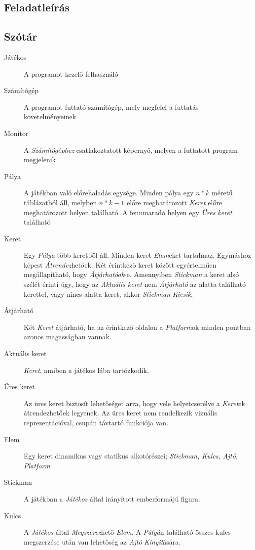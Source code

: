 \subsection{Feladatleírás}
\subsection{Szótár}

\begin{description}

    \item[Játékos] A programot kezelő felhasználó
    \item[Számítógép] A programot futtató számítógép, mely megfelel a futtatás követelményeinek
    \item[Monitor] A \emph{Számítógéphez} csatlakoztatott képernyő, melyen a futtatott program megjelenik
    \item[Pálya] A játékban való előrehaladás egysége. Minden pálya egy $n*k$ méretű táblázatból áll, melyben $n*k-1$ előre meghatározott \emph{Keret} előre meghatározott helyen található. A fennmaradó helyen egy \emph{Üres keret} található
    \item[Keret] Egy \emph{Pálya} több keretből áll. Minden keret \emph{Elem}eket tartalmaz. Egymáshoz képest \emph{Átrendez}hetőek. Két érintkező keret között egyértelműen megállapítható, hogy \emph{Átjárhatóak}-e. Amennyiben \emph{Stickman} a keret alsó szélét érinti úgy, hogy az \emph{Aktuális keret} nem \emph{Átjárható} az alatta található kerettel, vagy nincs alatta keret, akkor \emph{Stickman} \emph{Kiesik}.
    \item[Átjárható] Két \emph{Keret} átjárható, ha az érintkező oldalon a \emph{Platform}ok minden pontban azonos magasságban vannak.
    \item[Aktuális keret] \emph{Keret}, amiben a játékos lába tartózkodik.
    \item[Üres keret] Az üres keret biztosít lehetőséget arra, hogy vele helyetcserélve a \emph{Keret}ek átrendezhetőek legyenek. Az üres keret nem rendelkezik vizuális reprezentációval, csupán távtartó funkciója van.
    \item[Elem] Egy keret dinamikus vagy statikus alkotórészei; \emph{Stickman, Kulcs, Ajtó, Platform}
    \item[Stickman] A játékban a \emph{Játékos} által irányított emberformájú figura.
    \item[Kulcs] A \emph{Játékos} által \emph{Megszerez}hető \emph{Elem}. A \emph{Pályá}n található összes kulcs megszerzése után van lehetőség az \emph{Ajtó} \emph{Kinyit}ására.

\end{description}
